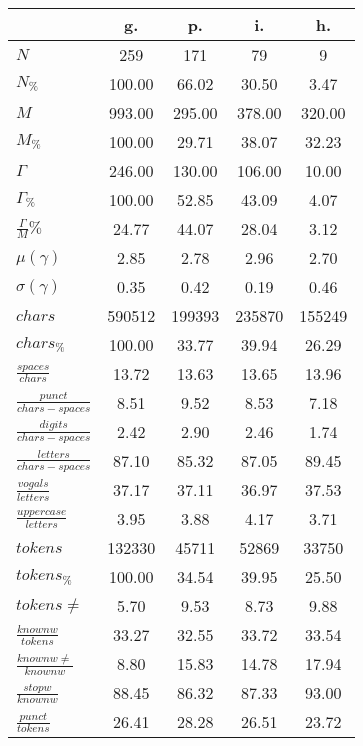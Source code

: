 \begin{table}[h!]
\begin{center}
\begin{tabular}{| l || c | c | c | c |}\hline
 & {\bf g.} & {\bf p.} & {\bf i.} & {\bf h.} \\\hline\hline
$N$ & 259  & 171  & 79  & 9 \\
$N_{\%}$ & 100.00  & 66.02  & 30.50  & 3.47 \\\hline
$M$ & 993.00  & 295.00  & 378.00  & 320.00 \\
$M_{\%}$ & 100.00  & 29.71  & 38.07  & 32.23 \\\hline
$\Gamma$ & 246.00  & 130.00  & 106.00  & 10.00 \\
$\Gamma_{\%}$ & 100.00  & 52.85  & 43.09  & 4.07 \\\hline
$\frac{\Gamma}{M}\%$ & 24.77  & 44.07  & 28.04  & 3.12 \\
$\mu(\gamma)$ & 2.85  & 2.78  & 2.96  & 2.70 \\
$\sigma(\gamma)$ & 0.35  & 0.42  & 0.19  & 0.46 \\\hline\hline
$chars$ & 590512  & 199393  & 235870  & 155249 \\
$chars_{\%}$ & 100.00  & 33.77  & 39.94  & 26.29 \\\hline
$\frac{spaces}{chars}$ & 13.72  & 13.63  & 13.65  & 13.96 \\
$\frac{punct}{chars-spaces}$ & 8.51  & 9.52  & 8.53  & 7.18 \\
$\frac{digits}{chars-spaces}$ & 2.42  & 2.90  & 2.46  & 1.74 \\\hline
$\frac{letters}{chars-spaces}$ & 87.10  & 85.32  & 87.05  & 89.45 \\
$\frac{vogals}{letters}$ & 37.17  & 37.11  & 36.97  & 37.53 \\
$\frac{uppercase}{letters}$ & 3.95  & 3.88  & 4.17  & 3.71 \\\hline\hline
$tokens$ & 132330  & 45711  & 52869  & 33750 \\
$tokens_{\%}$ & 100.00  & 34.54  & 39.95  & 25.50 \\
$tokens \neq$ & 5.70  & 9.53  & 8.73  & 9.88 \\\hline
$\frac{knownw}{tokens}$ & 33.27  & 32.55  & 33.72  & 33.54 \\
$\frac{knownw \neq}{knownw}$ & 8.80  & 15.83  & 14.78  & 17.94 \\\hline
$\frac{stopw}{knownw}$ & 88.45  & 86.32  & 87.33  & 93.00 \\
$\frac{punct}{tokens}$ & 26.41  & 28.28  & 26.51  & 23.72 \\

\end{tabular}
\end{center}
\end{table}
